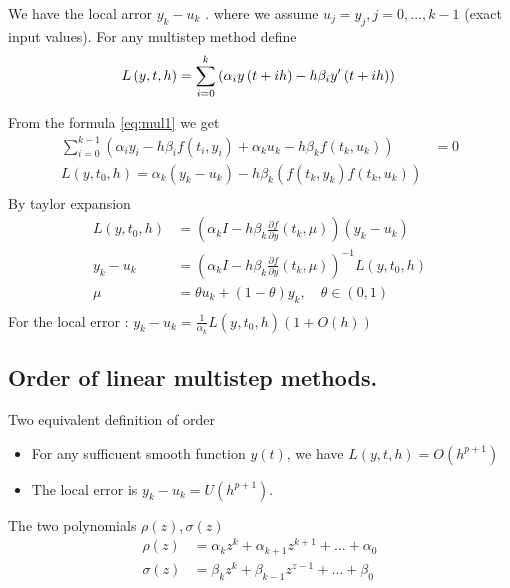 \documentclass{article}
\theoremstyle{remark}
\newcommand{\newpara}
  {
  \vskip 0.4cm
  }
\begin{document}
We have the local arror $y_{k} - u_{k}$ . where we assume $u_{j} = y_{j} , j = 0, \ldots, k-1$ (exact input values). For any multistep method define \[
L\left( y, t, h \right) =  \sum_{i=0}^{k} \left( \alpha _{i} y\left( t+ ih \right) - h \beta _{i} y' \left( t + ih \right) \right) \\
\] 


From the formula \eqref{eq:mul1} we get \[
  \begin{split}
\sum_{i=0}^{k-1}  \left( \alpha _{i} y_{i} - h \beta _{i}f\left( t_{i} , y_{i} \right) + \alpha _{k} u_{k} - h \beta _{k} f\left( t_{k} , u_{k} \right) \right)  & = 0 \\
L\left( y, t_{0}, h \right) =  \alpha _{k} \left( y_{k}- u_{k}   \right) - h \beta _{k}\left( f\left( t_{k} , y_{k} \right) f\left( t_{k}, u_{k} \right) \right)  &  \\
  \end{split} 
\]  
By taylor expansion \[
  \begin{split}
L\left( y, t_{0},h \right) &=  \left( \alpha _{k} I - h \beta _{k} \frac{\partial f}{\partial y} \left( t_{k}, \mu  \right) \right) \left( y_{k} - u_{k} \right) \\
y_{k} - u_{k} &=  \left( \alpha _{k} I - h \beta _{k} \frac{\partial f}{\partial y} \left( t_{k}, \mu  \right) \right) ^{-1} L\left( y, t_{0}, h \right)\\
\mu &=  \theta u_{k} + \left( 1- \theta  \right) y_{k}, \quad  \theta  \in  \left( 0,1 \right)  \\
  \end{split} 
\] 
For the local error : $y_{k} - u_{k} = \frac{1}{\alpha _{k}}  L \left( y_{}, t_{0}, h \right) \left( 1 + O\left( h \right) \right)$

\newpara
\subsection{Order of linear multistep methods.}%
\label{sub:order_of_linear_multistep_methods_}

Two equivalent definition of order 
 \begin{itemize}
   \item For any sufficuent smooth function $y\left( t \right)$, we have $L\left( y,t,h \right) = O\left( h^{p+1} \right)$
   \item The local error is $y_{k}- u_{k} = U\left( h^{p+1} \right)$.
 \end{itemize}

 \begin{definition}
   The two polynomials $\rho \left( z \right), \sigma \left( z \right)$ \[
     \begin{split}
   \rho \left( z \right)  & = \alpha _{k} z^{k} + \alpha _{k+1} z^{k+1} + \ldots + \alpha _{0}  \\
   \sigma \left( z \right) &=  \beta _{k}z^{k} + \beta _{k-1} z^{z-1} + \ldots + \beta_{0}  \\
     \end{split} 
   \] 
 \end{definition}
\end{document}
